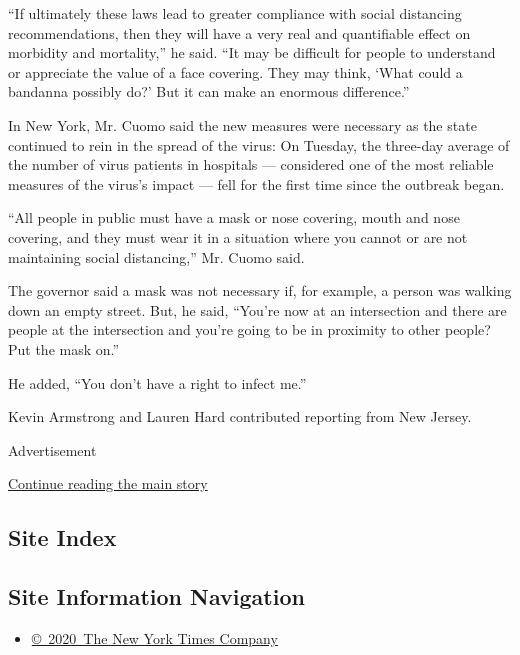 ``If ultimately these laws lead to greater compliance with social
distancing recommendations, then they will have a very real and
quantifiable effect on morbidity and mortality,'' he said. ``It may be
difficult for people to understand or appreciate the value of a face
covering. They may think, `What could a bandanna possibly do?' But it
can make an enormous difference.''

In New York, Mr. Cuomo said the new measures were necessary as the state
continued to rein in the spread of the virus: On Tuesday, the three-day
average of the number of virus patients in hospitals --- considered one
of the most reliable measures of the virus's impact --- fell for the
first time since the outbreak began.

``All people in public must have a mask or nose covering, mouth and nose
covering, and they must wear it in a situation where you cannot or are
not maintaining social distancing,'' Mr. Cuomo said.

The governor said a mask was not necessary if, for example, a person was
walking down an empty street. But, he said, ``You're now at an
intersection and there are people at the intersection and you're going
to be in proximity to other people? Put the mask on.''

He added, ``You don't have a right to infect me.''

Kevin Armstrong and Lauren Hard contributed reporting from New Jersey.

Advertisement

\protect\hyperlink{after-bottom}{Continue reading the main story}

\hypertarget{site-index}{%
\subsection{Site Index}\label{site-index}}

\hypertarget{site-information-navigation}{%
\subsection{Site Information
Navigation}\label{site-information-navigation}}

\begin{itemize}
\tightlist
\item
  \href{https://help.nytimes3xbfgragh.onion/hc/en-us/articles/115014792127-Copyright-notice}{©~2020~The
  New York Times Company}
\end{itemize}

